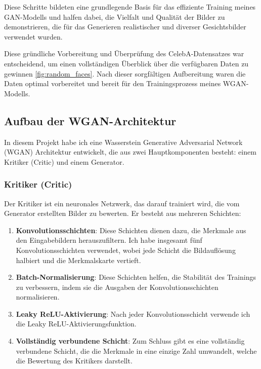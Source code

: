 \documentclass[a4paper, 12pt]{article}
\begin{document}
Diese Schritte bildeten eine grundlegende Basis für das effiziente Training meines GAN-Modells und halfen dabei, die Vielfalt und Qualität der Bilder zu demonstrieren, die für das Generieren realistischer und diverser Gesichtsbilder verwendet wurden.


Diese gründliche Vorbereitung und Überprüfung des CelebA-Datensatzes war entscheidend, um einen vollständigen Überblick über die verfügbaren Daten zu gewinnen \ref{fig:random_faces}. Nach dieser sorgfältigen Aufbereitung waren die Daten optimal vorbereitet und bereit für den Trainingsprozess meines WGAN-Modells.


\subsection{Aufbau der WGAN-Architektur}

In diesem Projekt habe ich eine Wasserstein Generative Adversarial Network (WGAN) Architektur entwickelt, die aus zwei Hauptkomponenten besteht: einem Kritiker (Critic) und einem Generator.

\subsubsection{Kritiker (Critic)}

Der Kritiker ist ein neuronales Netzwerk, das darauf trainiert wird, die vom Generator erstellten Bilder zu bewerten. Er besteht aus mehreren Schichten:

\begin{enumerate}
    \item \textbf{Konvolutionsschichten}: Diese Schichten dienen dazu, die Merkmale aus den Eingabebildern herauszufiltern. Ich habe insgesamt fünf Konvolutionsschichten verwendet, wobei jede Schicht die Bildauflösung halbiert und die Merkmalskarte vertieft.
    \item \textbf{Batch-Normalisierung}: Diese Schichten helfen, die Stabilität des Trainings zu verbessern, indem sie die Ausgaben der Konvolutionsschichten normalisieren.
    \item \textbf{Leaky ReLU-Aktivierung}: Nach jeder Konvolutionsschicht verwende ich die Leaky ReLU-Aktivierungsfunktion.
    \item \textbf{Vollständig verbundene Schicht}: Zum Schluss gibt es eine vollständig verbundene Schicht, die die Merkmale in eine einzige Zahl umwandelt, welche die Bewertung des Kritikers darstellt.
\end{enumerate}
\end{document}
